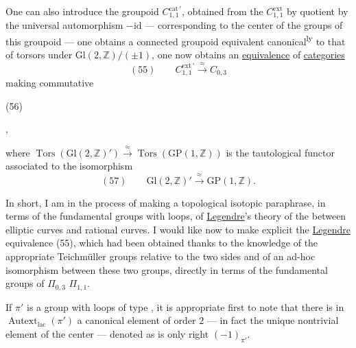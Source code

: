 One can also introduce the groupoid
$C_{1,1}^{\mathrm{cat}\,\prime}$, obtained from the 
$C_{1,1}^{\mathrm{ext}}$ by 
quotient by the universal automorphism $-\mathrm{id}$
--- corresponding to the center  of the
 groups of this groupoid --- one obtains
a connected groupoid equivalent canonical\textsuperscript{ly}
to that of torsors under 
$\mathrm{Gl}(2,\mathbb Z)/(\pm1)$,
 one now obtains an
\uline{equivalence} of \uline{categories}
\[
(55)\qquad C_{1,1}^{\mathrm{ext}\,\prime}\xrightarrow{\approx}C_{0,3}
\]
making commutative

\begin{samepage}
(56)\quad
{}
\end{samepage},

where $\operatorname{Tors}(\mathrm{Gl}(2,\mathbb Z)')\xrightarrow{\approx}
\operatorname{Tors}(\mathrm{GP}(1,\mathbb Z))$ is
the tautological functor associated to the isomorphism
\[
(57)\qquad \mathrm{Gl}(2,\mathbb Z)'\xrightarrow{\approx}\mathrm{GP}(1,\mathbb Z).
\]

In short, I am in the process of making a
topological isotopic paraphrase, in terms
of the fundamental groups with loops, of
\uline{Legendre}'s theory of the  between
elliptic curves and rational curves.
I would like now to make explicit the
\uline{Legendre} equivalence (55), which had
been obtained thanks to the knowledge of the
appropriate Teichmüller groups relative
to the two sides and of an ad-hoc isomorphism
between these two groups,
directly in terms of the
fundamental groups of  $\Pi_{0,3}$  $\Pi_{1,1}$.

If $\pi'$ is a group with loops of type
, it is appropriate first to note that
there is in $\operatorname{Autext}_{\mathrm{lac}}(\pi')$ a canonical element
of order $2$ --- in fact the unique nontrivial element
of the center --- denoted as is only right $(-1)_{\pi'}$.

